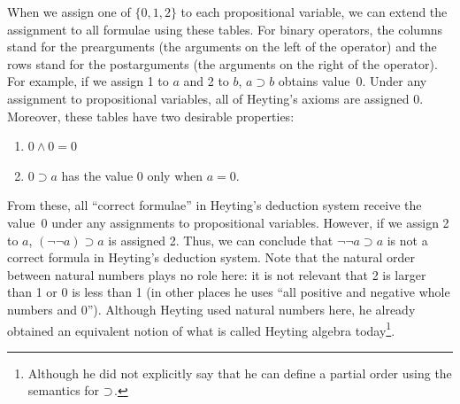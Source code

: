 When we assign one of $\{0,1,2\}$ to each propositional variable, we
can extend the assignment to all formulae using these tables.
For binary operators, the columns stand for the prearguments (the
arguments on the left of the operator) and the
rows stand for the postarguments (the arguments on the right of the operator).
For example, if we assign 1 to $a$ and 2 to $b$,
$a\supset b$ obtains value~0.
Under any assignment to propositional variables, all of Heyting's axioms
are assigned 0.  Moreover, these tables have two desirable properties:
\begin{enumerate}
 \item $0\land 0 = 0$
 \item $0\supset a$ has the value 0 only when $a = 0$.
\end{enumerate}
From these, all ``correct formulae'' in Heyting's deduction system
receive the value~0 under any assignments to propositional variables.
However, if we assign 2 to $a$, $(\neg \neg a)\supset a$
is assigned 2.  Thus, we can conclude that $\neg \neg a \supset a$ is
not a correct formula in Heyting's deduction system.
Note that the natural order between natural numbers
plays no role here: it is not relevant that 2 is larger than 1 or 0 is
less than 1 (in other places he uses ``all positive and negative
whole numbers and 0'').  Although Heyting used natural numbers here, he
already obtained an equivalent notion of what is called Heyting algebra
today\footnote{Although he did not explicitly say that he can define a
partial order using the semantics for $\supset$.}.

